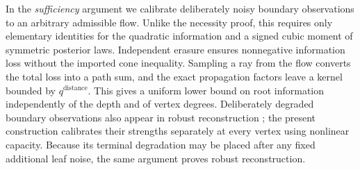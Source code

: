 In the \emph{sufficiency} argument we calibrate deliberately noisy
boundary observations to an arbitrary admissible flow. Unlike the
necessity proof, this requires only elementary identities for the
quadratic information and a signed cubic moment of symmetric
posterior laws. Independent erasure ensures nonnegative information
loss without the imported cone inequality. Sampling a ray from the
flow converts the total loss into a path sum, and the exact
propagation factors leave a kernel bounded by $q^{\text{distance}}$.
This gives a uniform lower bound on root information independently
of the depth and of vertex degrees. Deliberately degraded boundary
observations also appear in robust reconstruction \cite{JM04}; the
present construction calibrates their strengths separately at every
vertex using nonlinear capacity. Because its terminal degradation may be
placed after any fixed additional leaf noise, the same argument proves
robust reconstruction.
